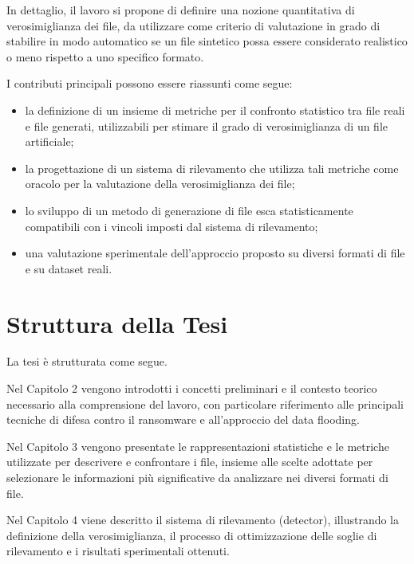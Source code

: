 \documentclass{report}
\begin{document}
\bigskip

In dettaglio, il lavoro si propone di definire una nozione quantitativa di verosimiglianza dei file, 
da utilizzare come criterio di valutazione in grado di stabilire in modo automatico se 
un file sintetico possa essere considerato realistico o meno rispetto a uno specifico formato.

\bigskip

I contributi principali possono essere riassunti come segue:

\begin{itemize}
    \item la definizione di un insieme di metriche per il confronto statistico tra
    file reali e file generati, utilizzabili per stimare il grado di verosimiglianza di
    un file artificiale;
    \item la progettazione di un sistema di rilevamento che utilizza tali metriche
    come oracolo per la valutazione della verosimiglianza dei file;
    \item lo sviluppo di un metodo di generazione di file esca statisticamente
    compatibili con i vincoli imposti dal sistema di rilevamento;
    \item una valutazione sperimentale dell’approccio proposto su diversi
    formati di file e su dataset reali.
\end{itemize}


\section{Struttura della Tesi}

La tesi è strutturata come segue.

\bigskip
Nel Capitolo 2 vengono introdotti i concetti preliminari e il contesto teorico necessario 
alla comprensione del lavoro, con particolare riferimento alle principali tecniche di difesa 
contro il ransomware e all’approccio del data flooding.

\bigskip

Nel Capitolo 3 vengono presentate le rappresentazioni statistiche e le metriche utilizzate 
per descrivere e confrontare i file, insieme alle scelte adottate 
per selezionare le informazioni più significative da analizzare nei diversi formati di file.

\bigskip

Nel Capitolo 4 viene descritto il sistema di rilevamento (detector),
illustrando la definizione della verosimiglianza, il processo di ottimizzazione delle
soglie di rilevamento e i risultati sperimentali ottenuti.
\end{document}
